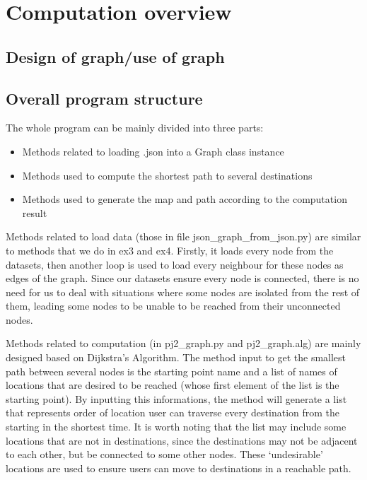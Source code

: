 \documentclass[12pt]{article}
\begin{document}
	\section*{Computation overview}
	\subsection*{Design of graph/use of graph}
	\subsection*{Overall program structure}
	The whole program can be mainly divided into three parts:
	\begin{itemize}
		\item Methods related to loading .json into a Graph class instance
		\item Methods used to compute the shortest path to several destinations
		\item Methods used to generate the map and path according to the computation result
	\end{itemize}
	
	Methods related to load data (those in file json\_graph\_from\_json.py) are similar to methods that we do in ex3 and ex4. Firstly, it loads every node from the datasets, then another loop is used to load every neighbour for these nodes as edges of the graph. Since our datasets ensure every node is connected, there is no need for us to deal with situations where some nodes are isolated from the rest of them, leading some nodes to be unable to be reached from their unconnected nodes.
	
	Methods related to computation (in pj2\_graph.py and pj2\_graph.alg) are mainly designed based on Dijkstra’s Algorithm\cite{noauthor_dijkstras_2025}. The method input to get the smallest path between several nodes is the starting point name and a list of names of locations that are desired to be reached (whose first element of the list is the starting point). By inputting this informations, the method will generate a list that represents order of location user can traverse every destination from the starting in the shortest time. It is worth noting that the list may include some locations that are not in destinations, since the destinations may not be adjacent to each other, but be connected to some other nodes. These ‘undesirable’ locations are used to ensure users can move to destinations in a reachable path.
	
\end{document}
